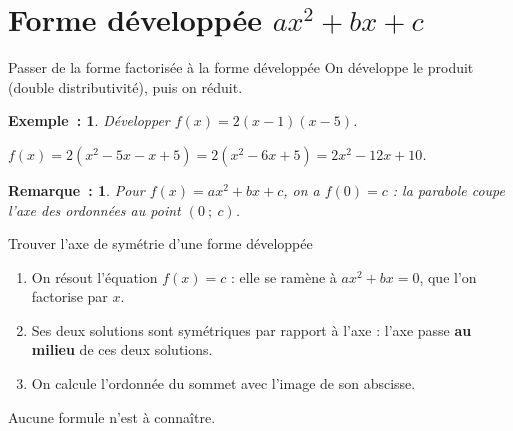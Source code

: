 \documentclass[12pt]{article}
\theoremstyle{break}
\newtheorem*{example}{Exemple~:}
\newtheorem*{remark}{Remarque~:}
\theoremstyle{inline}
\begin{document}
\newpage
\section{Forme développée $ax^2 + bx + c$}

\begin{method}{Passer de la forme factorisée à la forme développée}{}
  On développe le produit (double distributivité), puis on réduit.
\end{method}

\begin{example}
  Développer $f(x) = 2(x - 1)(x - 5)$.
  \begin{multihideW}[0.5em]
    $f(x) = 2(x^2 - 5x - x + 5) = 2(x^2 - 6x + 5) = 2x^2 - 12x + 10$.
  \end{multihideW}
\end{example}

\begin{remark}
  Pour $f(x) = ax^2 + bx + c$, on a $f(0) = c$ : la parabole coupe l'axe des ordonnées au point $(0~;~c)$.
\end{remark}

\begin{method}{Trouver l'axe de symétrie d'une forme développée}{}
  \begin{enumerate}
    \item On résout l'équation $f(x) = c$ : elle se ramène à $ax^2 + bx = 0$, que l'on factorise par $x$.
    \item Ses deux solutions sont symétriques par rapport à l'axe : l'axe passe \textbf{au milieu} de ces deux solutions.
    \item On calcule l'ordonnée du sommet avec l'image de son abscisse.
  \end{enumerate}
  Aucune formule n'est à connaître.
\end{method}
\end{document}
